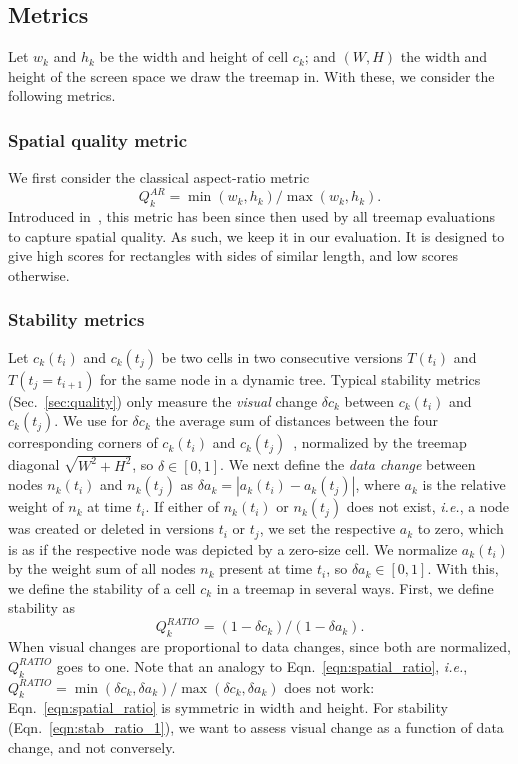 \subsection{Metrics}
\label{sec:mat_metrics}
%
Let $w_k$ and $h_k$ be the width and height of cell $c_k$; and $(W,H)$ the width and height of the screen space we draw the treemap in. With these, we consider the following metrics.

\subsubsection{Spatial quality metric}
\label{sec:mat_met_spatial}
%
We first consider the classical aspect-ratio metric
%
\begin{equation}
Q^{AR}_k = \min(w_k,h_k)/\max(w_k,h_k).
\label{eqn:spatial_ratio}
\end{equation}
%
Introduced in~\cite{sqr}, this metric has been since then used by all treemap evaluations to capture spatial quality. As such, we keep it in our evaluation. It is designed to give high scores for rectangles with sides of similar length, and low scores otherwise.
%

\subsubsection{Stability metrics}
\label{sec:mat_met_stab}
%
Let $c_k(t_i)$ and $c_k(t_j)$ be two cells in two consecutive versions $T(t_i)$ and $T(t_j=t_{i+1})$ for the same node in a dynamic tree. Typical stability metrics (Sec.~\ref{sec:quality}) only measure the \emph{visual} change $\delta c_k$ between $c_k(t_i)$ and $c_k(t_j)$. We use for $\delta c_k$ the average sum of distances between the four corresponding corners of $c_k(t_i)$ and $c_k(t_j)$~\citep{ordered}, normalized by the treemap diagonal $\sqrt{W^2+H^2}$, so $\delta \in [0,1]$. We next define the \emph{data change} between nodes $n_k(t_i)$ and $n_k(t_j)$ as $\delta a_k = |a_k(t_i)-a_k(t_j)|$, where $a_k$ is the relative weight of $n_k$ at time $t_i$. If either of $n_k(t_i)$ or $n_k(t_j)$ does not exist, \emph{i.e.}, a node was created or deleted in versions $t_i$ or $t_j$, we set the respective $a_k$ to zero, which is as if the respective node was depicted by a zero-size cell. We normalize $a_k(t_i)$ by the weight sum of all nodes $n_k$ present at time $t_i$, so $\delta a_k \in [0,1]$. With this, we define the stability of a cell $c_k$ in a treemap in several ways. First, we define stability as
%
\begin{equation}
Q^{RATIO}_k =  (1-\delta c_k) / (1 - \delta a_k).
\label{eqn:stab_ratio_1}
\end{equation}
%
When visual changes are proportional to data changes, since both are normalized, $Q^{RATIO}_k$ goes to one. Note that an analogy to Eqn.~\ref{eqn:spatial_ratio}, \emph{i.e.}, $Q^{RATIO}_k=\min(\delta c_k, \delta a_k)/\max(\delta c_k, \delta a_k)$ does not work: Eqn.~\ref{eqn:spatial_ratio} is symmetric in width and height. For stability (Eqn.~\ref{eqn:stab_ratio_1}), we want to assess visual change as a function of data change, and not conversely.

